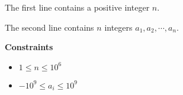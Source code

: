The first line contains a positive integer $n$.

The second line contains $n$ integers $a_1, a_2, \cdots, a_n$.

\textbf{Constraints}
\begin{itemize}
    \item $1 \le n \le 10^6$
    \item $-10^9 \le a_i \le 10^9$
\end{itemize}